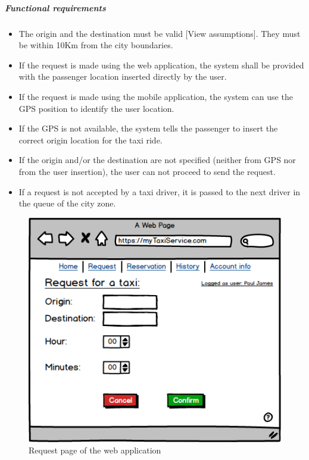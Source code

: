 \subparagraph{Functional requirements}
\noindent
	\begin{itemize}
		\item The origin and the destination must be valid [View assumptions]. They must be within 10Km from the city boundaries.
		\item If the request is made using the web application, the system shall be provided with the passenger location inserted directly by the user.
		\item If the request is made using the mobile application, the system can use the GPS position to identify the user location.
		\item If the GPS is not available, the system tells the passenger to insert the correct origin location for the taxi ride.
		\item If the origin and/or the destination are not specified (neither from GPS nor from the user insertion), the user can not proceed to send the request.
		\item If a request is not accepted by a taxi driver, it is passed to the next driver in the queue of the city zone.
	\end{itemize}
	
\begin{figure}[H]
    \centering
    \includegraphics[width=\textwidth]{./Mockups/RequestWeb.png}
    \caption{Request page of the web application}
\end{figure}